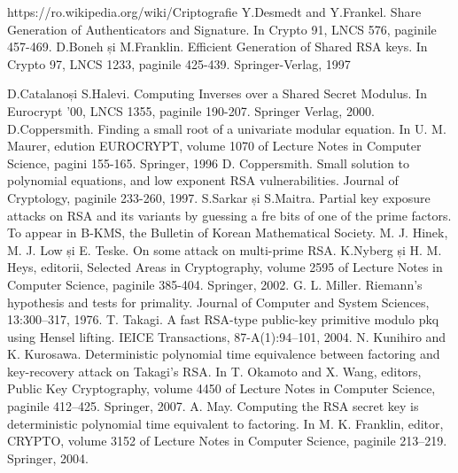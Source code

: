 \documentclass[12pt, oneside]{book}
\begin{document}
\begin{thebibliography}{9}

https://ro.wikipedia.org/wiki/Criptografie
Y.Desmedt and Y.Frankel. Share Generation of Authenticators and Signature. In Crypto 91, LNCS 576, paginile 457-469.
D.Boneh și M.Franklin. Efficient Generation of Shared RSA keys. In Crypto 97, LNCS 1233, paginile 425-439. Springer-Verlag, 1997

D.Catalanoși S.Halevi. Computing Inverses over a Shared Secret Modulus. In Eurocrypt '00, LNCS 1355, paginile 190-207. Springer Verlag, 2000.
D.Coppersmith. Finding a small root of a univariate modular equation. In U. M. Maurer, edution EUROCRYPT, volume 1070 of Lecture Notes in Computer Science, pagini 155-165. Springer, 1996
D. Coppersmith. Small solution to polynomial equations, and low exponent RSA vulnerabilities. Journal of Cryptology, paginile 233-260, 1997.
S.Sarkar și S.Maitra. Partial key exposure attacks on RSA and its variants by guessing a fre bits of one of the prime factors. To appear in B-KMS, the Bulletin of Korean Mathematical Society.
M. J. Hinek, M. J. Low și E. Teske. On some attack on multi-prime RSA. K.Nyberg și H. M. Heys, editorii, Selected Areas in Cryptography, volume 2595 of Lecture Notes in Computer Science, paginile 385-404. Springer, 2002.
G. L. Miller. Riemann’s hypothesis and tests for primality. Journal of Computer and System Sciences, 13:300–317, 1976. 
 T. Takagi. A fast RSA-type public-key primitive modulo pkq using Hensel lifting. IEICE Transactions, 87-A(1):94–101, 2004. 
 N. Kunihiro and K. Kurosawa. Deterministic polynomial time equivalence between factoring and key-recovery attack on Takagi’s RSA. In T. Okamoto and X. Wang, editors, Public Key Cryptography, volume 4450 of Lecture Notes in Computer Science, paginile 412–425. Springer, 2007.
 A. May. Computing the RSA secret key is deterministic polynomial time equivalent to factoring. In M. K. Franklin, editor, CRYPTO, volume 3152 of Lecture Notes in Computer Science, paginile 213–219. Springer, 2004. 
\end{thebibliography}
\end{document}
